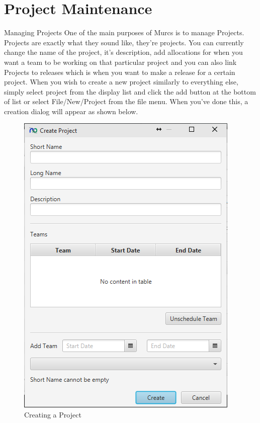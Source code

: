 \section{Project Maintenance}

Managing Projects
\newline\newline
One of the main purposes of Murcs is to manage Projects. Projects are exactly what they sound like, they're projects. You can currently change the name of the project, it's description, add allocations for when you want a team to be working on that particular project and you can also link Projects to releases which is when you want to make a release for a certain project.
\newline
When you wish to create a new project similarly to everything else, simply select project from the display list and click the add button at the bottom of list or select File/New/Project from the file menu. When you've done this, a creation dialog will appear as shown below.

\begin{figure}[H]
\centering
\includegraphics[width=\textwidth]{images/screenshots/projects1.PNG}
\caption{Creating a Project}
\label{fig:new_project}
\end{figure}

